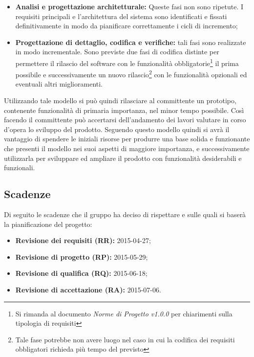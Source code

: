 \begin{itemize}
	\item \textbf{Analisi e progettazione architetturale:} Queste fasi non sono ripetute. I requisiti principali e l'architettura del sistema sono identificati e fissati definitivamente in modo da pianificare correttamente i cicli di incremento; 
	\item \textbf{Progettazione di dettaglio, codifica e verifiche:} tali fasi sono realizzate in modo incrementale. Sono previste due fasi di codifica distinte per permettere il rilascio del software con le funzionalità obbligatorie\footnote{Si rimanda al documento \textit{Norme di Progetto v1.0.0} per chiarimenti sulla tipologia di requisiti} il prima possibile e successivamente un nuovo rilascio\footnote{Tale fase potrebbe non avere luogo nel caso in cui la codifica dei requisiti obbligatori richieda più tempo del previsto} con le funzionalità opzionali ed eventuali altri miglioramenti.
\end{itemize}
Utilizzando tale modello si può quindi rilasciare al committente un prototipo, contenente funzionalità di primaria importanza, nel minor tempo possibile. Così facendo il committente può accertarsi dell'andamento dei lavori valutare in corso d'opera lo sviluppo del prodotto. Seguendo questo modello quindi si avrà il vantaggio di spendere le iniziali risorse per produrre una base solida e funzionante che presenti il modello nei suoi aspetti di maggiore importanza, e successivamente utilizzarla per sviluppare ed ampliare il prodotto con funzionalità desiderabili e funzionali.
 
\subsection{Scadenze}
Di seguito le scadenze che il gruppo \GRUPPO{} ha deciso di rispettare e sulle quali si baserà la pianificazione del progetto:
\begin{itemize}
	\item \textbf{Revisione dei requisiti (RR):} 2015-04-27;
	\item \textbf{Revisione di progetto (RP):} 2015-05-29;
	\item \textbf{Revisione di qualifica (RQ):} 2015-06-18;
	\item \textbf{Revisione di accettazione (RA):} 2015-07-06.
\end{itemize}




